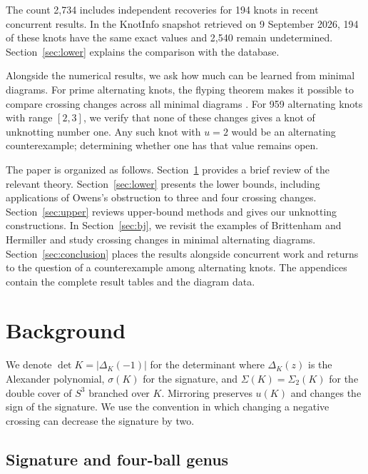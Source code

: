 \documentclass[12pt, oneside]{amsart}
\newcommand{\dbc}{\Sigma}
\newcommand{\KI}{\textsf{KnotInfo}}
\newcommand{\nDichotomy}{959}
\newcommand{\nExact}{2{,}734}
\newcommand{\nLatestExactAgreements}{194}
\newcommand{\nLatestUnresolvedExact}{2{,}540}
\begin{document}
The count \nExact{} includes independent recoveries for 194 knots in recent concurrent
results\cite{GP}. In the \KI{} snapshot retrieved on 9 September 2026,
\nLatestExactAgreements{} of these knots have the same exact values and
\nLatestUnresolvedExact{} remain undetermined.
Section~\ref{sec:lower} explains the comparison with the database.

Alongside the numerical results, we ask how much can be learned from minimal diagrams.
For prime alternating knots, the flyping theorem makes it possible to compare crossing
changes across all minimal diagrams \cite{MT,BH1705}. For \nDichotomy{} alternating
knots with range $[2,3]$, we verify that none of these changes gives a knot of
unknotting number one. Any such knot with $u=2$ would be an alternating
counterexample; determining whether one has that value remains open.

The paper is organized as follows. Section~\ref{sec:background} provides a brief review of the relevant theory. Section~\ref{sec:lower} presents
the lower bounds, including applications of Owens's obstruction to three and four crossing
changes. Section~\ref{sec:upper} reviews upper-bound methods and gives our unknotting
constructions. In Section~\ref{sec:bj}, we revisit the examples of Brittenham and Hermiller
and study crossing changes in minimal alternating diagrams.
Section~\ref{sec:conclusion} places the results alongside concurrent work and
returns to the question of a counterexample among alternating knots.
The appendices contain the complete result tables and the diagram data.


\section{Background}\label{sec:background}

We denote $\det K=|\Delta_K(-1)|$ for the determinant where $\Delta_K(z)$ is the Alexander polynomial, $\sigma(K)$ for the signature, and
$\dbc(K)=\dbc_2(K)$ for the double cover of $S^3$ branched over $K$. Mirroring preserves
$u(K)$ and changes the sign of the signature. We use the convention in which changing a
negative crossing can decrease the signature by two.

\subsection{Signature and four-ball genus}
\end{document}
